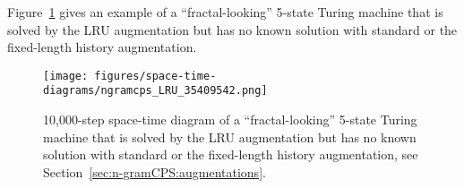 Figure~\ref{fig:ngram-cps-more} gives an example of a ``fractal-looking'' 5-state Turing machine that is solved by the LRU augmentation but has no known solution with standard \ngramcps or the fixed-length history augmentation.

\begin{figure}
    \centering
    \texttt{[image: figures/space-time-diagrams/ngramcps\_LRU\_35409542.png]}

    \caption{10,000-step space-time diagram of a ``fractal-looking'' 5-state Turing machine that is solved by the LRU augmentation but has no known solution with standard \ngramcps or the fixed-length history augmentation, see Section~\ref{sec:n-gramCPS:augmentations}. }\label{fig:ngram-cps-more}
\end{figure}





